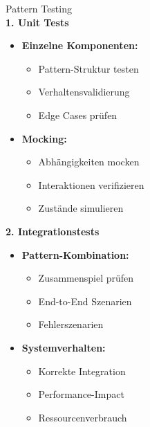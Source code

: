 \begin{KR}{Pattern Testing}\\
\textbf{1. Unit Tests}
\begin{itemize}
    \item \textbf{Einzelne Komponenten:}
    \begin{itemize}
        \item Pattern-Struktur testen
        \item Verhaltensvalidierung
        \item Edge Cases prüfen
    \end{itemize}
    
    \item \textbf{Mocking:}
    \begin{itemize}
        \item Abhängigkeiten mocken
        \item Interaktionen verifizieren
        \item Zustände simulieren
    \end{itemize}
\end{itemize}

\textbf{2. Integrationstests}
\begin{itemize}
    \item \textbf{Pattern-Kombination:}
    \begin{itemize}
        \item Zusammenspiel prüfen
        \item End-to-End Szenarien
        \item Fehlerszenarien
    \end{itemize}
    
    \item \textbf{Systemverhalten:}
    \begin{itemize}
        \item Korrekte Integration
        \item Performance-Impact
        \item Ressourcenverbrauch
    \end{itemize}
\end{itemize}
\end{KR}

